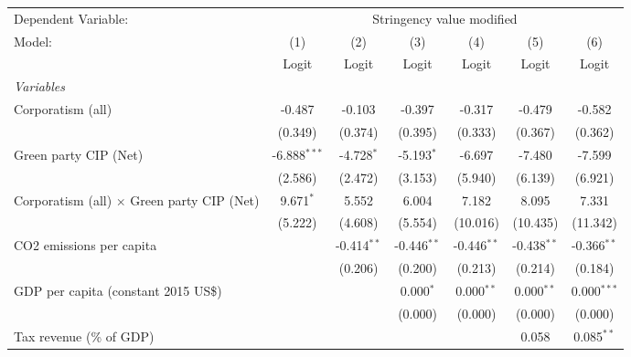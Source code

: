 
\begingroup
\centering
\begin{tabular}{lcccccc}
   \toprule
   Dependent Variable: & \multicolumn{6}{c}{Stringency value modified}\\
   Model:                                            & (1)            & (2)           & (3)           & (4)           & (5)           & (6)\\  
                                                     &  Logit         & Logit         & Logit         & Logit         & Logit         & Logit\\  
   \midrule
   \emph{Variables}\\
   Corporatism (all)                                 & -0.487         & -0.103        & -0.397        & -0.317        & -0.479        & -0.582\\   
                                                     & (0.349)        & (0.374)       & (0.395)       & (0.333)       & (0.367)       & (0.362)\\   
   Green party CIP (Net)                             & -6.888$^{***}$ & -4.728$^{*}$  & -5.193$^{*}$  & -6.697        & -7.480        & -7.599\\   
                                                     & (2.586)        & (2.472)       & (3.153)       & (5.940)       & (6.139)       & (6.921)\\   
   Corporatism (all) $\times$ Green party CIP (Net)  & 9.671$^{*}$    & 5.552         & 6.004         & 7.182         & 8.095         & 7.331\\   
                                                     & (5.222)        & (4.608)       & (5.554)       & (10.016)      & (10.435)      & (11.342)\\   
   CO2 emissions per capita                          &                & -0.414$^{**}$ & -0.446$^{**}$ & -0.446$^{**}$ & -0.438$^{**}$ & -0.366$^{**}$\\   
                                                     &                & (0.206)       & (0.200)       & (0.213)       & (0.214)       & (0.184)\\   
   GDP per capita (constant 2015 US\$)               &                &               & 0.000$^{*}$   & 0.000$^{**}$  & 0.000$^{**}$  & 0.000$^{***}$\\   
                                                     &                &               & (0.000)       & (0.000)       & (0.000)       & (0.000)\\   
   Tax revenue (\% of GDP)                           &                &               &               &               & 0.058         & 0.085$^{**}$\\   

\end{tabular}
